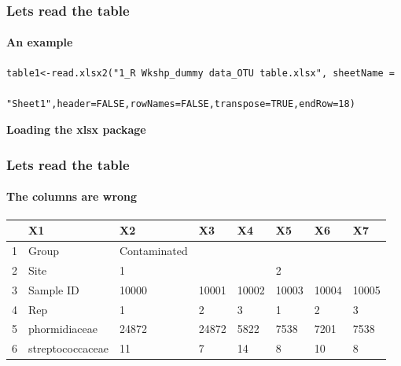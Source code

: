 \documentclass[12pt]{beamer}\usepackage[]{graphicx}\usepackage[]{color}
\makeatletter
\newenvironment{kframe}{%
 \def\at@end@of@kframe{}%
 \ifinner\ifhmode%
  \def\at@end@of@kframe{\end{minipage}}%
  \begin{minipage}{\columnwidth}%
 \fi\fi%
 \def\FrameCommand##1{\hskip\@totalleftmargin \hskip-\fboxsep
 \colorbox{shadecolor}{##1}\hskip-\fboxsep
     \hskip-\linewidth \hskip-\@totalleftmargin \hskip\columnwidth}%
 \MakeFramed {\advance\hsize-\width
   \@totalleftmargin\z@ \linewidth\hsize
   \@setminipage}}%
 {\par\unskip\endMakeFramed%
 \at@end@of@kframe}
\newenvironment{knitrout}{}{} %
\makeatother
\begin{document}
\begin{frame}[fragile]
  \frametitle{Lets read the table}
  \framesubtitle{An example}
\begin{lstlisting} 
table1<-read.xlsx2("1_R Wkshp_dummy data_OTU table.xlsx", sheetName = 

"Sheet1",header=FALSE,rowNames=FALSE,transpose=TRUE,endRow=18)
\end{lstlisting}
{\bf Loading the xlsx package}  
\begin{knitrout}
\color{fgcolor}\begin{kframe}


{\ttfamily\noindent\itshape\color{messagecolor}{\#\# Loading required package: xlsx}}

{\ttfamily\noindent\color{warningcolor}{\#\# Warning: package 'xlsx' was built under R version 3.1.3}}

{\ttfamily\noindent\itshape\color{messagecolor}{\#\# Loading required package: rJava}}

{\ttfamily\noindent\color{warningcolor}{\#\# Warning: package 'rJava' was built under R version 3.1.3}}

{\ttfamily\noindent\itshape\color{messagecolor}{\#\# Loading required package: methods\\\#\# Loading required package: xlsxjars\\\#\# Loading required package: xtable}}\end{kframe}
\end{knitrout}
\end{frame}
\begin{frame}[fragile]
  \frametitle{Lets read the table}
  \framesubtitle{The columns are wrong}
\begin{table}[ht]
\centering
\begin{tabular}{rlllllll}
  \hline
 & X1 & X2 & X3 & X4 & X5 & X6 & X7 \\ 
  \hline
1 & Group & Contaminated &  &  &  &  &  \\ 
  2 & Site & 1 &  &  & 2 &  &  \\ 
  3 & Sample ID & 10000 & 10001 & 10002 & 10003 & 10004 & 10005 \\ 
  4 & Rep & 1 & 2 & 3 & 1 & 2 & 3 \\ 
  5 & phormidiaceae & 24872 & 24872 & 5822 & 7538 & 7201 & 7538 \\ 
  6 & streptococcaceae & 11 & 7 & 14 & 8 & 10 & 8 \\ 
   \hline
\end{tabular}
\end{table}

\clearpage
\end{frame}
\end{document}
